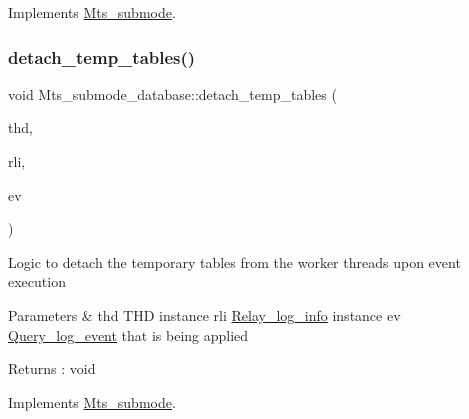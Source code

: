 Implements \mbox{\hyperlink{classMts__submode}{Mts\+\_\+submode}}.

\mbox{\label{classMts__submode__database_a25224ffe29bd078e228f5d43c7d7ed0f}} 
\subsubsection{\texorpdfstring{detach\+\_\+temp\+\_\+tables()}{detach\_temp\_tables()}}
{\footnotesize\ttfamily void Mts\+\_\+submode\+\_\+database\+::detach\+\_\+temp\+\_\+tables (\begin{DoxyParamCaption}\item[{T\+HD $\ast$}]{thd,  }\item[{const \mbox{\hyperlink{classRelay__log__info}{Relay\+\_\+log\+\_\+info}} $\ast$}]{rli,  }\item[{\mbox{\hyperlink{classQuery__log__event}{Query\+\_\+log\+\_\+event}} $\ast$}]{ev }\end{DoxyParamCaption})\hspace{0.3cm}{\ttfamily [virtual]}}

Logic to detach the temporary tables from the worker threads upon event execution 
\begin{DoxyParams}{Parameters}
{\em } & thd T\+HD instance rli \mbox{\hyperlink{classRelay__log__info}{Relay\+\_\+log\+\_\+info}} instance ev \mbox{\hyperlink{classQuery__log__event}{Query\+\_\+log\+\_\+event}} that is being applied \\
\hline
\end{DoxyParams}
\begin{DoxyReturn}{Returns}
\+: void 
\end{DoxyReturn}


Implements \mbox{\hyperlink{classMts__submode}{Mts\+\_\+submode}}.

\mbox{\label{classMts__submode__database_a16f0e272b7a37929ff5659fc88ed0643}} 

